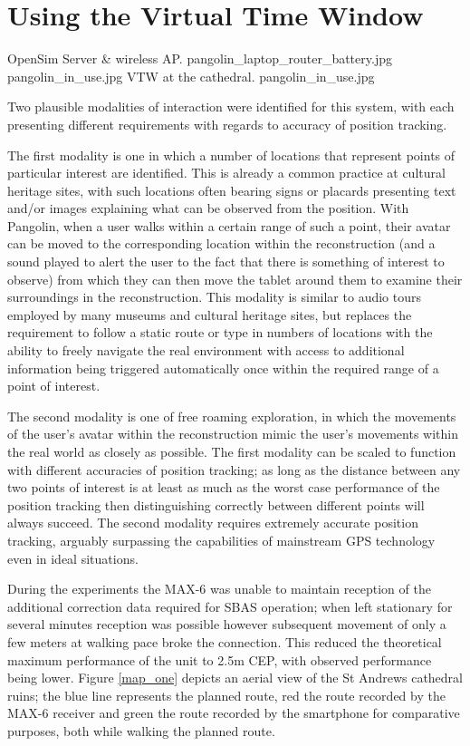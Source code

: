 
\section{Using the Virtual Time Window}

 {OpenSim Server \& wireless AP.} {pangolin_laptop_router_battery.jpg}
       {pangolin_in_use.jpg} {VTW at the cathedral.} {pangolin_in_use.jpg}

Two plausible modalities of interaction were identified for this system, with each presenting different requirements with regards to accuracy of position tracking.

The first modality is one in which a number of locations that represent points of particular interest are identified. This is already a common practice at cultural heritage sites, with such locations often bearing signs or placards presenting text and/or images explaining what can be observed from the position. With Pangolin, when a user walks within a certain range of such a point, their avatar can be moved to the corresponding location within the reconstruction (and a sound played to alert the user to the fact that there is something of interest to observe) from which they can then move the tablet around them to examine their surroundings in the reconstruction. This modality is similar to audio tours employed by many museums and cultural heritage sites, but replaces the requirement to follow a static route or type in numbers of locations with the ability to freely navigate the real environment with access to additional information being triggered automatically once within the required range of a point of interest.

The second modality is one of free roaming exploration, in which the movements of the user's avatar within the reconstruction mimic the user's movements within the real world as closely as possible.
The first modality can be scaled to function with different accuracies of position tracking; as long as the distance between any two points of interest is at least as much as the worst case performance of the position tracking then distinguishing correctly between different points will always succeed. The second modality requires extremely accurate position tracking, arguably surpassing the capabilities of mainstream GPS technology even in ideal situations.

During the experiments the MAX-6 was unable to maintain reception of the additional correction data required for SBAS operation; when left stationary for several minutes reception was possible however subsequent movement of only a few meters at walking pace broke the connection. This reduced the theoretical maximum performance of the unit to 2.5m CEP, with observed performance being lower. Figure \ref{map_one} depicts an aerial view of the St Andrews cathedral ruins; the blue line represents the planned route, red the route recorded by the MAX-6 receiver and green the route recorded by the smartphone for comparative purposes, both while walking the planned route.

